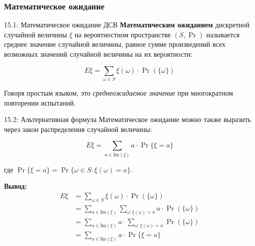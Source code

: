 \documentclass[a4paper,12pt]{article}
\begin{document}
	\subsubsection{Математическое ожидание}
	
	\begin{definitionbox}{15.1: Математическое ожидание ДСВ}
		\textbf{Математическим ожиданием} дискретной случайной величины \(\xi\) на вероятностном пространстве \((S, \Pr)\) называется среднее значение случайной величины, равное сумме произведений всех возможных значений случайной величины на их вероятности:
		
		\[ E\xi = \sum_{\omega \in S} \xi(\omega) \cdot \Pr(\{\omega\}) \]
		
		Говоря простым языком, это \textit{среднеожидаемое значение} при многократном повторении испытаний.
	\end{definitionbox}
	
	\begin{remarkbox}{15.2: Альтернативная формула}
		Математическое ожидание можно также выразить через закон распределения случайной величины:
		
		\[ E\xi = \sum_{a \in \text{Im}(\xi)} a \cdot \Pr\{\xi = a\} \]
		
		где \(\Pr\{\xi = a\} = \Pr\{\omega \in S : \xi(\omega) = a\}\).
		
		\textbf{Вывод:}
		\begin{align*}
			E\xi &= \sum_{\omega \in S} \xi(\omega) \cdot \Pr(\{\omega\}) \\
			&= \sum_{a \in \text{Im}(\xi)} \sum_{\omega: \xi(\omega)=a} a \cdot \Pr(\{\omega\}) \\
			&= \sum_{a \in \text{Im}(\xi)} a \cdot \sum_{\omega: \xi(\omega)=a} \Pr(\{\omega\}) \\
			&= \sum_{a \in \text{Im}(\xi)} a \cdot \Pr\{\xi = a\}
		\end{align*}
	\end{remarkbox}
	
	\begin{center}
	\end{center}
	
\end{document}
